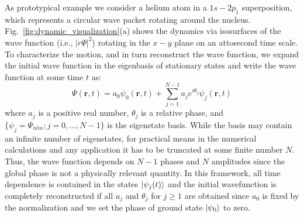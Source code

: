 As prototypical example we consider a helium atom in a $1s-2p_1$ superposition, which represents a circular wave packet rotating around the nucleus. Fig.~\ref{fig:dynamic_visualization}(a) shows the dynamics via isosurfaces of the wave function (i.e., $\left|r\Psi\right|^2$) rotating in the $x-y$ plane on an attosecond time scale. To characterize the motion, and in turn reconstruct the wave function, we expand the initial wave function in the eigenbasis of stationary states and write the wave function at some time $t$ as: 
%
\begin{equation}
    \Psi({\bm r},t) = a_0 \psi_0({\bm r},t) + \sum_{j=1}^{N-1} a_j e^{i\theta_j} \psi_j({\bm r},t)
    \label{eq:expansion}
\end{equation}
%
where $a_j$ is a positive real number, $\theta_j $ is a relative phase, and $\{ \psi_j = \Psi_{nlm}; j = 0, \ldots, N-1\}$ is the eigenstate basis. While the basis may contain an infinite number of eigenstates, for practical means in the numerical calculations and any application it has to be truncated at some finite number $N$. Thus, the wave function depends on $N-1$ phases and $N$ amplitudes since the global phase is not a physically relevant quantity. In this framework, all time dependence is contained in the states $\ket{\psi_j(t)}$ and the initial wavefunction is completely reconstructed if all $a_j$ and $\theta_j$ for $j\geq 1$ are obtained since $a_0$ is fixed by the normalization and we set the phase of ground state $\ket{\psi_0}$ to zero.

